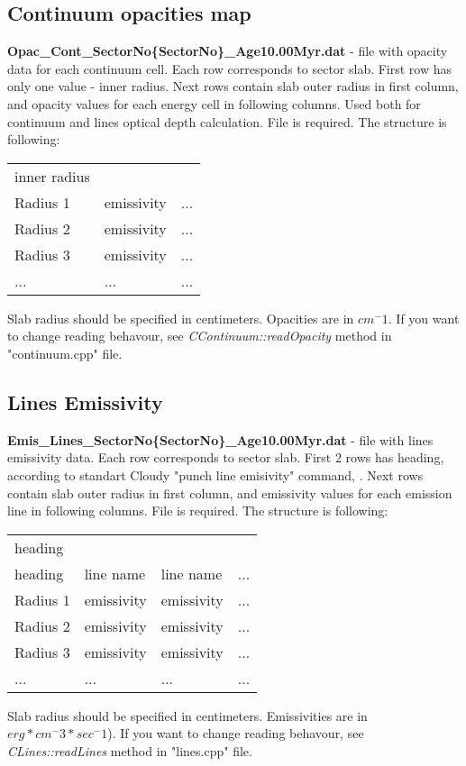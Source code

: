 \documentclass[a4paper]{article}
\begin{document}
\subsection{Continuum opacities map}
{\bf Opac\_Cont\_SectorNo\{SectorNo\}\_Age10.00Myr.dat} - file with opacity data for each continuum cell. Each row
corresponds to sector slab. First row has only one value - inner radius. Next rows contain slab outer radius in first column, 
and opacity values for each energy cell in following columns. Used both for continuum and lines optical depth calculation. 
File is required.
The structure is following:
\begin{table}[H]
    \begin{tabular}{lll}
        inner radius & & \\
        Radius 1 & emissivity & ... \\
        Radius 2 & emissivity & ... \\
        Radius 3 & emissivity & ... \\
        ... & ... & ... \\
    \end{tabular}
\end{table}
Slab radius should be specified in centimeters. Opacities are in $cm^-1$.
If you want to change reading behavour, see {\it CContinuum::readOpacity} method in "continuum.cpp" file.

\subsection{Lines Emissivity}
\label{dataLines}
{\bf Emis\_Lines\_SectorNo\{SectorNo\}\_Age10.00Myr.dat} - file with lines emissivity data. Each row
corresponds to sector slab. First 2 rows has heading, according to standart Cloudy 
"punch line emisivity" command, \cite{Cloudy}. Next rows contain slab outer radius in first column, 
and emissivity values for each emission line in following columns. File is required.
The structure is following:
\begin{table}[H]
    \begin{tabular}{llll}
        heading & & & \\
        heading & line name & line name & ...\\
        Radius 1 & emissivity & emissivity & ... \\
        Radius 2 & emissivity & emissivity & ... \\
        Radius 3 & emissivity & emissivity & ... \\
        ... & ... & ... & ... \\
    \end{tabular}
\end{table}
Slab radius should be specified in centimeters. Emissivities are in $erg * cm^-3 * sec^-1$).
If you want to change reading behavour, see {\it CLines::readLines} method in "lines.cpp" file.
\end{document}
